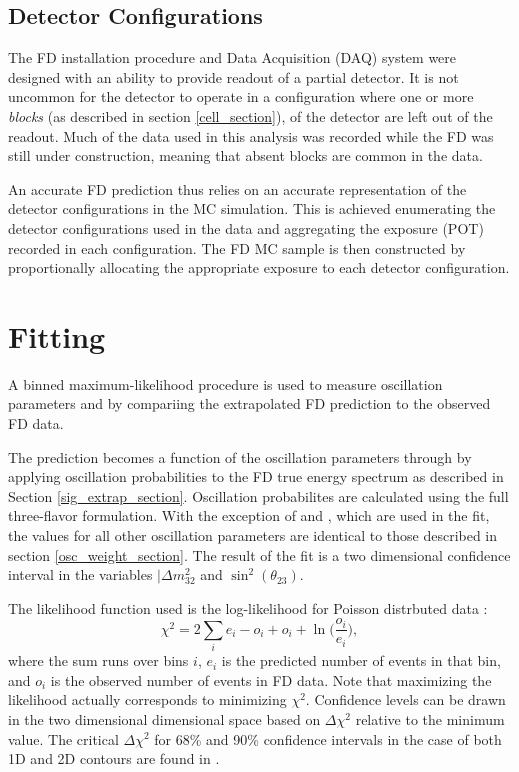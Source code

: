 \subsection{Detector Configurations}

The \nova FD installation procedure and Data Acquisition (DAQ) system were
designed with an ability to provide readout of a partial detector.
It is not uncommon for the detector to operate in a configuration where
one or more \textit{blocks} (as described in section \ref{cell_section}),
of the detector are left out of the readout.
Much of the data used in this analysis was recorded while the \nova FD
was still under construction, meaning that absent blocks are common
in the data.

An accurate FD prediction thus relies on an accurate representation
of the detector configurations in the MC simulation.
This is achieved enumerating the detector configurations
used in the data and aggregating the exposure (POT) recorded
in each configuration.
The FD MC sample is then constructed by proportionally allocating
the appropriate exposure to each detector configuration.

\section{Fitting}
\label{fitting_section}

A binned maximum-likelihood procedure is used to measure oscillation parameters
\deltamtht and \thetatth by compariing the extrapolated FD prediction to the
observed FD data.

The prediction becomes a function of the oscillation parameters
through by applying oscillation probabilities to the FD true energy spectrum
as described in Section \ref{sig_extrap_section}.
Oscillation probabilites are calculated using the full three-flavor formulation.
With the exception of \deltamtht and \thetatth, which are used in the fit,
the values for all other oscillation parameters are identical to those
described in section \ref{osc_weight_section}.
The result of the fit is a two dimensional confidence interval
in the variables $|\Delta m^2_{32}$ and $\sin^2(\theta_{23})$.

The likelihood function used is the log-likelihood for Poisson distrbuted
data \cite{pdg}:
\begin{equation}
\chi^2 = 2 \sum_i e_i - o_i + o_i + \ln \bigg (\frac{o_i}{e_i} \bigg),
\end{equation}
where the sum runs over bins $i$, $e_i$ is the predicted number of events
in that bin, and $o_i$ is the observed number of events in FD data.
Note that maximizing the likelihood actually corresponds to minimizing
$\chi^2$.
Confidence levels can be drawn in the two dimensional dimensional space
based on $\Delta \chi^2$ relative to the minimum value.
The critical $\Delta \chi^2$ for 68\% and 90\% confidence intervals
in the case of both 1D and 2D contours are found in \cite{pdg}.



